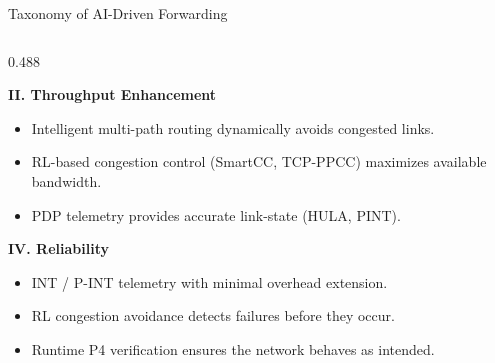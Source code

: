 {\begin{frame}{Taxonomy of AI-Driven Forwarding}
\begin{columns}[T, totalwidth=\textwidth]
    \begin{column}{0.488\textwidth}

      \begin{tcolorbox}[problemcard=HUAlight]
        {\color{HUAlight}\bfseries\small
          II. Throughput Enhancement}
        \vspace{4pt}
        \begin{itemize}
          \setlength\itemsep{2pt}
          \footnotesize
          \item Intelligent multi-path routing
                dynamically avoids congested links.
          \item RL-based congestion control
                (SmartCC, TCP-PPCC) maximizes
                available bandwidth.
          \item PDP telemetry provides accurate
                link-state (HULA, PINT).
        \end{itemize}
      \end{tcolorbox}

      \vspace{8pt}

      \begin{tcolorbox}[problemcard=solutiongreen]
        {\color{solutiongreen}\bfseries\small
          IV. Reliability}
        \vspace{4pt}
        \begin{itemize}
          \setlength\itemsep{2pt}
          \footnotesize
          \item INT / P-INT telemetry with
                minimal overhead extension.
          \item RL congestion avoidance detects
                failures before they occur.
          \item Runtime P4 verification ensures
                the network behaves as intended.\newline
        \end{itemize}
      \end{tcolorbox}

    \end{column}

  \end{columns}

\end{frame}
}